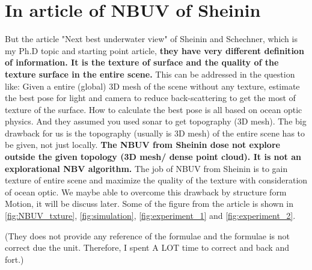 \documentclass{article}
\begin{document}
\section{In article of NBUV of Sheinin}
But the article "Next best underwater view" of Sheinin and Schechner, which is my Ph.D topic and starting point article, \textbf{they have very different definition of information. It is the texture of surface and the quality of the texture surface in the entire scene.} This can be addressed in the question like: Given a entire (global) 3D mesh of the scene without any texture, estimate the best pose for light and camera to reduce back-scattering to get the most of texture of the surface. How to calculate the best pose is all based on ocean optic physics. And they assumed you used sonar to get topography (3D mesh). The big drawback for us is the topography (usually is 3D mesh) of the entire scene has to be given, not just locally. \textbf{The NBUV from Sheinin dose not explore outside the given topology (3D mesh/ dense point cloud). It is not an explorational NBV algorithm.} The job of NBUV from Sheinin is to gain texture of entire scene and maximize the quality of the texture with consideration of ocean optic.  We maybe able to overcome this drawback by structure form Motion, it will be discuss later. Some of the figure from the article \cite{sheinin2016next} is shown in \ref{fig:NBUV_txture}, \ref{fig:simulation}, \ref{fig:experiment_1} and \ref{fig:experiment_2}.

(They does not provide any reference of the formulae and the formulae is not correct due the unit. Therefore, I spent A LOT time to correct and back and fort.)
\end{document}

